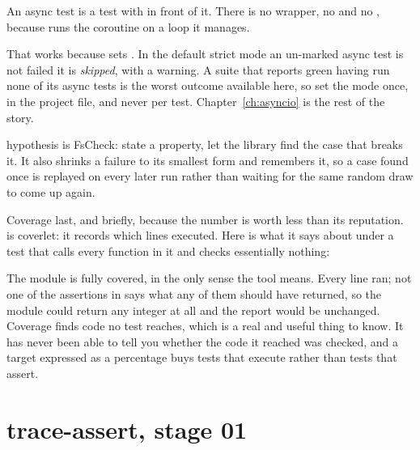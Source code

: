 An async test is a test with  in front of it. There is no
wrapper, no  and no , because
 runs the coroutine on a loop it manages.


\begin{warning}
That works because  sets
. In the default strict mode an un-marked async
test is not failed \dash{} it is \emph{skipped}, with a warning. A suite
that reports green having run none of its async tests is the worst outcome
available here, so set the mode once, in the project file, and never per
test. Chapter~\ref{ch:asyncio} is the rest of the story.
\end{warning}

\noindent
hypothesis is FsCheck: state a property, let the library find the case that
breaks it. It also shrinks a failure to its smallest form and remembers it,
so a case found once is replayed on every later run rather than waiting for
the same random draw to come up again.


\noindent
Coverage last, and briefly, because the number is worth less than its
reputation.  is coverlet: it records which lines executed.
Here is what it says about  under a test that
calls every function in it and checks essentially nothing:


\noindent
The module is fully covered, in the only sense the tool means. Every line
ran; not one of the assertions in  says
what any of them should have returned, so the module could return any
integer at all and the report would be unchanged. Coverage finds code no
test reaches, which is a real and useful thing to know. It has never been
able to tell you whether the code it reached was checked, and a target
expressed as a percentage buys tests that execute rather than tests that
assert.

\section{trace-assert, stage 01}
\label{sec:testing-traceassert}

